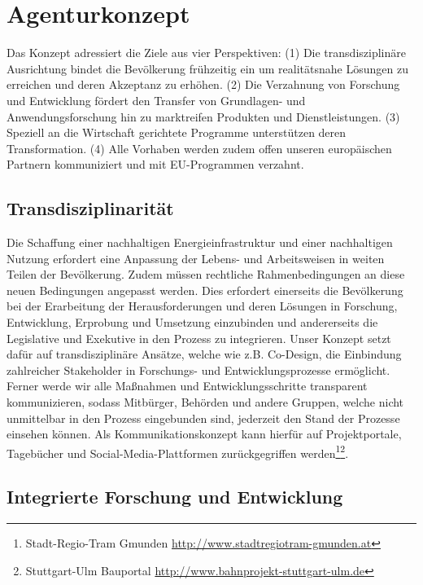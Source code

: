 \section{Agenturkonzept}

Das Konzept adressiert die Ziele aus vier Perspektiven:
(1) Die transdisziplinäre Ausrichtung bindet die Bevölkerung frühzeitig ein um realitätsnahe Lösungen zu erreichen und deren Akzeptanz zu erhöhen.
(2) Die Verzahnung von Forschung und Entwicklung fördert den Transfer von Grundlagen- und Anwendungsforschung hin zu marktreifen Produkten und Dienstleistungen.
(3) Speziell an die Wirtschaft gerichtete Programme unterstützen deren Transformation.
(4) Alle Vorhaben werden zudem offen unseren europäischen Partnern kommuniziert und mit EU-Programmen verzahnt. 

\subsection{Transdisziplinarität}

Die Schaffung einer nachhaltigen Energieinfrastruktur und einer nachhaltigen Nutzung erfordert eine Anpassung der Lebens- und Arbeitsweisen in weiten Teilen der Bevölkerung.
Zudem müssen rechtliche Rahmenbedingungen an diese neuen Bedingungen angepasst werden.
Dies erfordert einerseits die Bevölkerung bei der Erarbeitung der Herausforderungen und deren Lösungen in Forschung, Entwicklung, Erprobung und Umsetzung einzubinden und andererseits die Legislative und Exekutive in den Prozess zu integrieren.
Unser Konzept setzt dafür auf transdisziplinäre Ansätze, welche wie z.B. Co-Design, die Einbindung zahlreicher Stakeholder in Forschungs- und Entwicklungsprozesse ermöglicht.
Ferner werde wir alle Maßnahmen und Entwicklungsschritte transparent kommunizieren, sodass Mitbürger, Behörden und andere Gruppen, welche nicht unmittelbar in den Prozess eingebunden sind, jederzeit den Stand der Prozesse einsehen können.
Als Kommunikationskonzept kann hierfür auf Projektportale, Tagebücher und Social-Media-Plattformen zurückgegriffen werden\footnote{Stadt-Regio-Tram Gmunden \url{http://www.stadtregiotram-gmunden.at}}\footnote{Stuttgart-Ulm Bauportal \url{http://www.bahnprojekt-stuttgart-ulm.de}}.


\subsection{Integrierte Forschung und Entwicklung}

